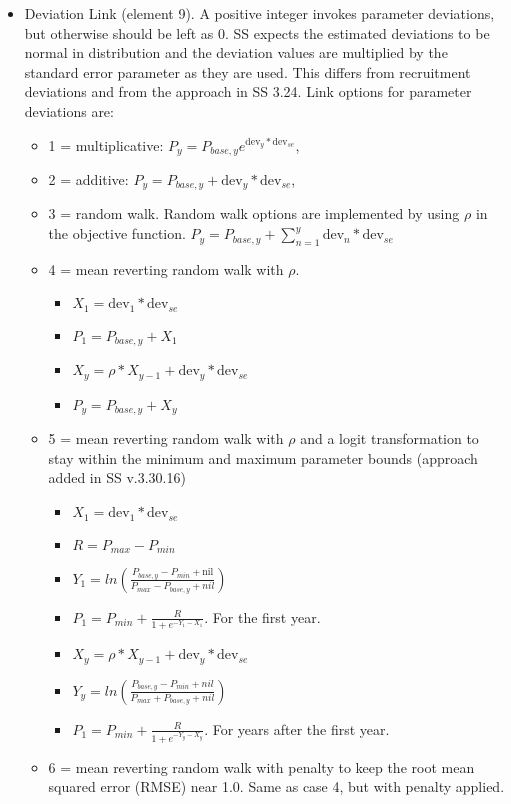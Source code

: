 \begin{itemize}
\item Deviation Link (element 9). A positive integer invokes parameter deviations, but otherwise should be left as 0. SS expects the estimated deviations to be normal in distribution and the deviation values are multiplied by the standard error parameter as they are used. This differs from recruitment deviations and from the approach in SS 3.24. Link options for parameter deviations are:
	\begin{itemize}
		\item 1 = multiplicative: $P_y = P_{base,y}e^{\text{dev}_y*\text{dev}_{se}}$,
		\item 2 = additive: $P_y = P_{base,y} + \text{dev}_y*\text{dev}_{se}$,
		\item 3 = random walk. Random walk options are implemented by using $\rho$ in the objective function. $P_y = P_{base,y} + \sum_{n=1}^{y} \text{dev}_n*\text{dev}_{se}$
		\item 4 = mean reverting random walk with $\rho$.
		\begin{itemize}
		    \item $X_1 = \text{dev}_1*\text{dev}_{se}$
			\item $P_1 = P_{base,y} + X_1$
			\item $X_y = \rho*X_{y-1} + \text{dev}_y*\text{dev}_{se}$
			\item $P_y = P_{base,y} + X_y$
		\end{itemize}
		\item 5 = mean reverting random walk with $\rho$ and a logit transformation to stay within the minimum and maximum parameter bounds (approach added in SS v.3.30.16)
	    \begin{itemize}
		    \item $X_1 = \text{dev}_1*\text{dev}_{se}$
			\item $R = P_{max} - P_{min}$
			\item $Y_1 = ln(\frac{P_{base,y} - P_{min} + \text{nil}}{P_{max} - P_{base,y} + nil})$
			\item $P_1 = P_{min} + \frac{R}{1 + e^{-Y_1 - X_1 }}$. For the first year.
			\item $X_y = \rho*X_{y-1} + \text{dev}_y*\text{dev}_{se}$ 
			\item $Y_y = ln(\frac{P_{base,y} - P_{min} + nil}{P_{max} + P_{base,y} + nil})$
			\item $P_1 = P_{min} + \frac{R}{1 + e^{-Y_y - X_y }}$. For years after the first year.
		\end{itemize}
		\item 6 = mean reverting random walk with penalty to keep the root mean squared error (RMSE) near 1.0. Same as case 4, but with penalty applied.

\end{itemize}
\end{itemize}

